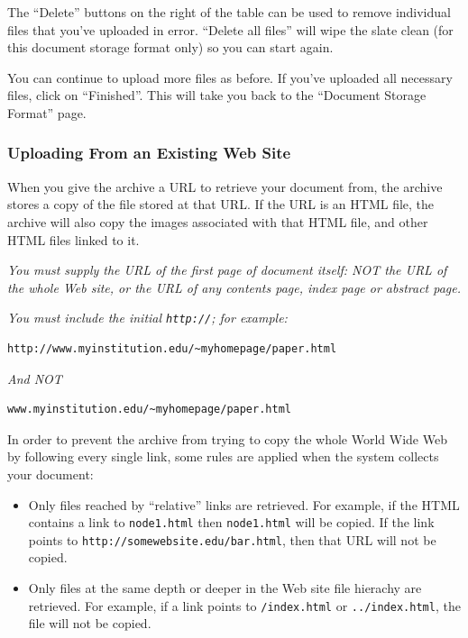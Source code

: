 The ``Delete'' buttons on the right of the table can be used to remove individual files that you've uploaded in error. ``Delete all files'' will wipe the slate clean (for this document storage format only) so you can start again.

You can continue to upload more files as before. If you've uploaded all necessary files, click on ``Finished''. This will take you back to the ``Document Storage Format'' page.


\subsubsection{Uploading From an Existing Web Site}

When you give the archive a URL to retrieve your document from, the archive stores a copy of the file stored at that URL. If the URL is an HTML file, the archive will also copy the images associated with that HTML file, and other HTML files linked to it.

\emph{You must supply the URL of the first page of document itself: NOT the URL of the whole Web site, or the URL of any contents page, index page or abstract page.}

\emph{You must include the initial {\tt http://}; for example:}

\begin{verbatim}
http://www.myinstitution.edu/~myhomepage/paper.html
\end{verbatim}

\emph{And NOT}
\begin{verbatim}
www.myinstitution.edu/~myhomepage/paper.html
\end{verbatim}

In order to prevent the archive from trying to copy the whole World Wide Web by following every single link, some rules are applied when the system collects your document:

\begin{itemize}
\item Only files reached by ``relative'' links are retrieved. For example, if the HTML contains a link to {\tt node1.html} then {\tt node1.html} will be copied. If the link points to {\tt http://somewebsite.edu/bar.html}, then that URL will not be copied.
\item Only files at the same depth or deeper in the Web site file hierachy are retrieved. For example, if a link points to {\tt /index.html} or {\tt ../index.html}, the file will not be copied.
\end{itemize}

